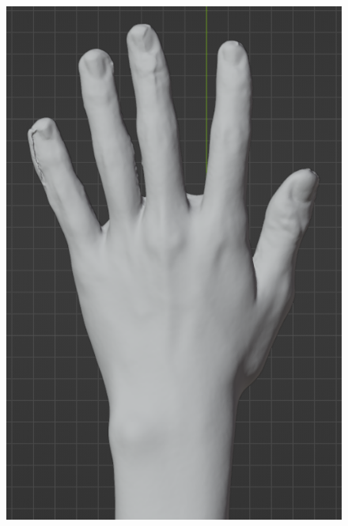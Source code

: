 \documentclass{ltjsreport}
\begin{document}
			\begin{figure}[H]
			\centering
			\begin{minipage}{0.4\columnwidth}
			\centering
			\includegraphics[width = \columnwidth]{../figs/SmoothingBeforRear.png}
			\end{minipage}
			\begin{minipage}{0.4\columnwidth}
			\centering

\end{minipage}
\end{figure}
\end{document}
